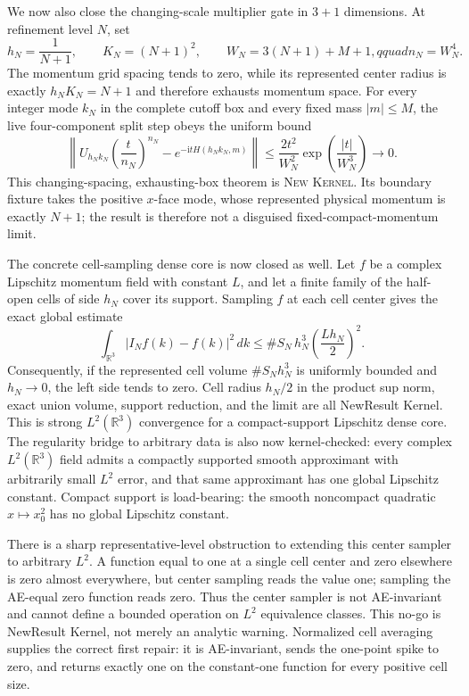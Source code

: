 \documentclass[11pt]{article}
\newcommand{\Kernel}{\textcolor{kernelcolor}{\textsc{Kernel}}}
\newcommand{\NewResult}{\textsc{New}}
\newcommand{\ii}{\mathrm{i}}
\begin{document}
  We now also close the changing-scale multiplier gate in $3+1$ dimensions.
  At refinement level $N$, set
  \begin{equation}\label{eq:scaledgrid}
    h_N=\frac{1}{N+1},\qquad K_N=(N+1)^2,\qquad
    W_N=3(N+1)+M+1,qquad n_N=W_N^4.
  \end{equation}
  The momentum grid spacing tends to zero, while its represented center radius
  is exactly $h_NK_N=N+1$ and therefore exhausts momentum space.  For every
  integer mode $k_N$ in the complete cutoff box and every fixed mass
  $|m|\leq M$, the live four-component split step obeys the uniform bound
  \begin{equation}\label{eq:scaledlivebound}
    \left\|U_{h_Nk_N}\!\left(\frac{t}{n_N}\right)^{n_N}
      -e^{-\ii tH(h_Nk_N,m)}\right\|
    \leq \frac{2t^2}{W_N^2}
      \exp\!\left(\frac{|t|}{W_N^3}\right)
    \longrightarrow0.
  \end{equation}
  This changing-spacing, exhausting-box theorem is \NewResult{} \Kernel{}.
  Its boundary fixture takes the positive $x$-face mode, whose represented
  physical momentum is exactly $N+1$; the result is therefore not a disguised
  fixed-compact-momentum limit.

  The concrete cell-sampling dense core is now closed as well.  Let $f$ be a
  complex Lipschitz momentum field with constant $L$, and let a finite family
  of the half-open cells of side $h_N$ cover its support.  Sampling $f$ at each
  cell center gives the exact global estimate
  \begin{equation}\label{eq:cellsamplingrate}
    \int_{\mathbb R^3}|I_Nf(k)-f(k)|^2\,dk
      \leq \#S_N\,h_N^3\left(\frac{Lh_N}{2}\right)^2.
  \end{equation}
  Consequently, if the represented cell volume $\#S_Nh_N^3$ is uniformly
  bounded and $h_N\to0$, the left side tends to zero.  Cell radius $h_N/2$ in
  the product sup norm, exact union volume, support reduction, and the limit
  are all NewResult{} Kernel{}.  This is strong $L^2(\mathbb R^3)$ convergence
  for a compact-support Lipschitz dense core.  The regularity bridge to
  arbitrary data is also now kernel-checked: every complex $L^2(\mathbb R^3)$
  field admits a compactly supported smooth approximant with arbitrarily small
  $L^2$ error, and that same approximant has one global Lipschitz constant.
  Compact support is load-bearing: the smooth noncompact quadratic
  $x\mapsto x_0^2$ has no global Lipschitz constant.

  There is a sharp representative-level obstruction to extending this center
  sampler to arbitrary $L^2$.  A function equal to one at a single cell center
  and zero elsewhere is zero almost everywhere, but center sampling reads the
  value one; sampling the AE-equal zero function reads zero.  Thus the center
  sampler is not AE-invariant and cannot define a bounded operation on $L^2$
  equivalence classes.  This no-go is NewResult{} Kernel{}, not merely an
  analytic warning.  Normalized cell averaging supplies the correct first
  repair: it is AE-invariant, sends the one-point spike to zero, and returns
  exactly one on the constant-one function for every positive cell size.
\end{document}

